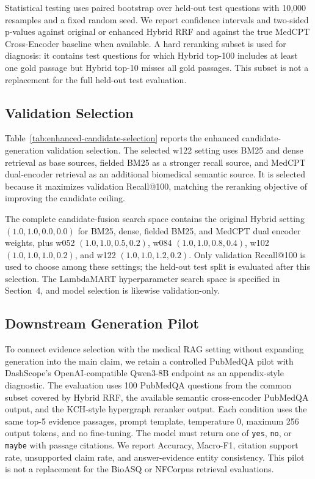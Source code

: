 Statistical testing uses paired bootstrap over held-out test questions with 10,000 resamples and a fixed random seed. We report confidence intervals and two-sided p-values against original or enhanced Hybrid RRF and against the true MedCPT Cross-Encoder baseline when available. A hard reranking subset is used for diagnosis: it contains test questions for which Hybrid top-100 includes at least one gold passage but Hybrid top-10 misses all gold passages. This subset is not a replacement for the full held-out test evaluation.

\subsection{Validation Selection}

Table~\ref{tab:enhanced-candidate-selection} reports the enhanced candidate-generation validation selection. The selected w122 setting uses BM25 and dense retrieval as base sources, fielded BM25 as a stronger recall source, and MedCPT dual-encoder retrieval as an additional biomedical semantic source. It is selected because it maximizes validation Recall@100, matching the reranking objective of improving the candidate ceiling.

The complete candidate-fusion search space contains the original Hybrid setting $(1.0,1.0,0.0,0.0)$ for BM25, dense, fielded BM25, and MedCPT dual encoder weights, plus w052 $(1.0,1.0,0.5,0.2)$, w084 $(1.0,1.0,0.8,0.4)$, w102 $(1.0,1.0,1.0,0.2)$, and w122 $(1.0,1.0,1.2,0.2)$. Only validation Recall@100 is used to choose among these settings; the held-out test split is evaluated after this selection. The LambdaMART hyperparameter search space is specified in Section~4, and model selection is likewise validation-only.



\subsection{Downstream Generation Pilot}

To connect evidence selection with the medical RAG setting without expanding generation into the main claim, we retain a controlled PubMedQA pilot with DashScope's OpenAI-compatible Qwen3-8B endpoint as an appendix-style diagnostic. The evaluation uses 100 PubMedQA questions from the common subset covered by Hybrid RRF, the available semantic cross-encoder PubMedQA output, and the KCH-style hypergraph reranker output. Each condition uses the same top-5 evidence passages, prompt template, temperature 0, maximum 256 output tokens, and no fine-tuning. The model must return one of \texttt{yes}, \texttt{no}, or \texttt{maybe} with passage citations. We report Accuracy, Macro-F1, citation support rate, unsupported claim rate, and answer-evidence entity consistency. This pilot is not a replacement for the BioASQ or NFCorpus retrieval evaluations.

